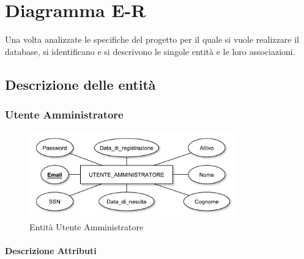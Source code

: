 
\chapter{Diagramma E-R}
\label{cap:diagramma}

Una volta analizzate le specifiche del progetto per il quale si vuole realizzare il database, si identificano e si descrivono le singole entità e le loro associazioni.

\section{Descrizione delle entità}

	\subsection{Utente Amministratore}\label{e:utente-amministratore}
	
	\begin{figure}[h]
		\centering
		\includegraphics[width=0.8\textwidth]
		{immagini/01-utente-amministratore}
		
		\caption{Entità Utente Amministratore}
	\end{figure}	
	
	\subsubsection*{Descrizione Attributi}
	
